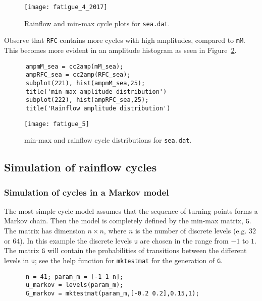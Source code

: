 \begin{figure}
\centering \texttt{[image: fatigue\_4\_2017]}
\vspace{-3mm}
\caption[Rainflow and min-max cycle plots for {\tt sea.dat}]
{Rainflow and min-max cycle plots for {\tt sea.dat}.}
\label{fig_wafo_6.4}
\end{figure}

Observe that \verb|RFC| contains more cycles with high amplitudes,
compared to \verb|mM|. This becomes more evident in an amplitude histogram as seen in Figure~\ref{fig_wafo_6.13}.
{\small\begin{verbatim}
      ampmM_sea = cc2amp(mM_sea);
      ampRFC_sea = cc2amp(RFC_sea);
      subplot(221), hist(ampmM_sea,25);
      title('min-max amplitude distribution')
      subplot(222), hist(ampRFC_sea,25);
      title('Rainflow amplitude distribution')
\end{verbatim}}

\begin{figure}
\centering
\texttt{[image: fatigue\_5]}
\vspace{-3mm}
\caption{min-max and rainflow cycle distributions for {\tt sea.dat}.}
\label{fig_wafo_6.13}
\end{figure}

\subsection{Simulation of rainflow cycles}
\label{sec:simulationcycles}

\subsubsection{Simulation of cycles in a Markov model}
\label{sec:simulationmarkov}
The most simple cycle model assumes that the sequence of
turning points forms a Markov chain. Then the model is completely defined
by the min-max matrix, \verb+G+. The matrix has dimension
$n \times n$, where $n$ is the number of discrete levels (e.g. $32$ or
$64$). In this example the discrete levels {\tt u} are chosen in the range
from $-1$ to $1$. The matrix {\tt G} will contain the probabilities of
transitions between the different levels in {\tt u}; see the help function
for {\tt mktestmat} for the generation of {\tt G}.
{\small\begin{verbatim}
      n = 41; param_m = [-1 1 n]; 
      u_markov = levels(param_m);
      G_markov = mktestmat(param_m,[-0.2 0.2],0.15,1);
\end{verbatim}}

